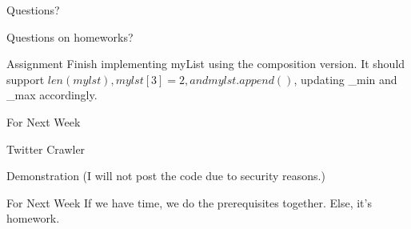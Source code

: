 \documentclass{beamer}
\begin{document}
\begin{frame}{Questions?}
\end{frame}

\begin{frame}{Questions on homeworks?}
\end{frame}

\begin{frame}{Assignment}
  Finish implementing myList using the composition version.
  It should support $len(mylst), mylst[3]=2, and mylst.append()$, updating \_min
  and \_max accordingly.
\end{frame}

\begin{frame}{For Next Week}
  \begin{center}
    Twitter Crawler
  \end{center}
\end{frame}

\begin{frame}{Demonstration}
  (I will not post the code due to security reasons.)
\end{frame}

\begin{frame}{For Next Week}
  If we have time, we do the prerequisites together.
  Else, it's homework.
\end{frame}
\end{document}
